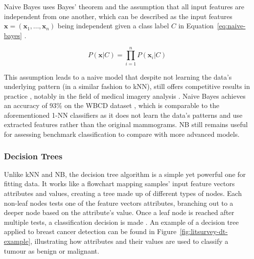 Naive Bayes uses Bayes' theorem and the assumption that all input features are independent from one another, which can be described as the input features $\textbf{x}=(\textbf{x}_1, ..., \textbf{x}_n)$ being independent given a class label $C$ in Equation~\ref{eq:naive-bayes} \citep{rish2001empirical}.

\begin{equation}
\label{eq:naive-bayes}
    P(\textbf{x}|C)=\prod_{i=1}^{n}P(\textbf{x}_i|C)
\end{equation}

This assumption leads to a naive model that despite not learning the data's underlying pattern (in a similar fashion to kNN), still offers competitive results in practice \citep{russell2002artificial}, notably in the field of medical imagery analysis \citep{rish2001empirical}. Naive Bayes achieves an accuracy of 93\% on the WBCD dataset \citep{Kharya2014}, which is comparable to the aforementioned 1-NN classifiers as it does not learn the data's patterns and use extracted features rather than the original mammograms. NB still remains useful for assessing benchmark classification to compare with more advanced models.

\subsubsection{Decision Trees}
\label{sec:litsurvey-dts}

Unlike kNN and NB, the decision tree algorithm is a simple yet powerful one for fitting data. It works like a flowchart mapping samples' input feature vectors attributes and values, creating a tree made up of different types of nodes. Each non-leaf nodes tests one of the feature vectors attributes, branching out to a deeper node based on the attribute's value. Once a leaf node is reached after multiple tests, a classification decision is made \citep{quinlan2014c4}. An example of a decision tree applied to breast cancer detection can be found in Figure~\ref{fig:litsurvey-dt-example}, illustrating how attributes and their values are used to classify a tumour as benign or malignant.\\

